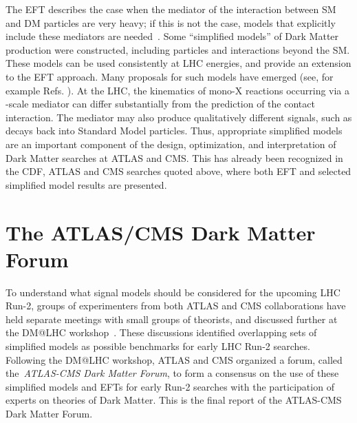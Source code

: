 The EFT describes the case when the mediator of the interaction between SM and DM particles are very heavy; 
if this is not the case, models that explicitly include these mediators are 
needed~\cite{Goodman:2010yf,Shoemaker:2011vi,Bai:2010hh,Kopp:2011eu,Fox:2011fx,Fox:2011pm,Shoemaker:2011vi,Busoni:2013lha}.
Some ``simplified models'' \cite{Alwall:2008ag,Goodman:2011jq,Alves:2011wf}
of Dark Matter production were constructed, including particles and interactions beyond the SM.
These models can be used consistently at LHC energies, and provide
an extension to the EFT approach. 
Many proposals for such models have emerged (see, for example
Refs. \cite{An:2012va,An:2012ue,Tait:2013,Buchmueller:2013dya,Bai:2013iqa,Bai:2014osa,An:2013xka,Yavin:14092893,Malik:2014ggr,Harris:2014hga,Buckley:2014fba,Haisch:2015ioa,Bai:2012xg,Carpenter:2012rg,Bell:2012rg,Petrov:2013nia,Carpenter:2013xra}). 
At the LHC, the kinematics of mono-X reactions occurring via a \tev-scale mediator can differ substantially from the prediction of the contact
interaction. The mediator may also produce qualitatively different signals, such as decays back into Standard Model particles. 
Thus, appropriate simplified models are an important component of the design, optimization, and interpretation of Dark Matter searches at ATLAS and CMS.
This has already been recognized in the CDF, ATLAS and CMS searches quoted above, where both EFT and selected simplified model
results are presented. 

\section{The ATLAS/CMS Dark Matter Forum}

To understand what signal models should be considered for the upcoming LHC Run-2, 
groups of experimenters from both ATLAS and CMS collaborations have held separate 
meetings with small groups of theorists, and discussed further at the DM@LHC 
workshop~\cite{Malik:2014ggr,Yavin:14092893,DMatLHCProceedings}. 
These discussions identified overlapping sets of simplified models as possible
benchmarks for early LHC Run-2 searches. 
Following the DM@LHC workshop, ATLAS and CMS organized a forum, called the~\textit{ATLAS-CMS Dark
Matter Forum}, to form a consensus on the use of these simplified models
and EFTs for early Run-2 searches with the participation of experts on
theories of Dark Matter. This is the final report of the ATLAS-CMS Dark Matter Forum.

